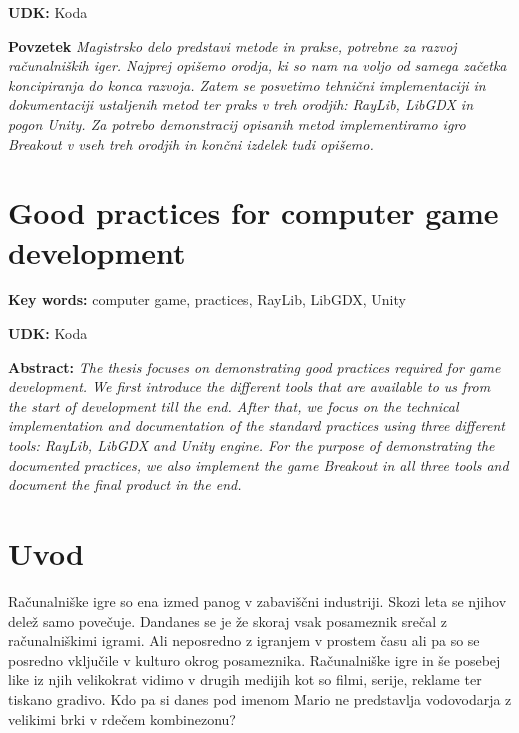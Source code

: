 \documentclass[12pt,a4paper,twoside]{book}
\begin{document}
\textbf{UDK:} Koda

\textbf{Povzetek}\newline
\textit{Magistrsko delo predstavi metode in prakse, potrebne za razvoj računalniških iger. Najprej opišemo orodja, ki so nam na voljo od samega začetka koncipiranja do konca razvoja. Zatem se posvetimo tehnični implementaciji in dokumentaciji ustaljenih metod ter praks v treh orodjih: RayLib, LibGDX in pogon Unity. Za potrebo demonstracij opisanih metod implementiramo igro Breakout v vseh treh orodjih in končni izdelek tudi opišemo.}
\cleardoublepage

\chapter*{Good practices for computer game development}\thispagestyle{fancy}
\textbf{Key words:} computer game, practices, RayLib, LibGDX, Unity

\textbf{UDK:} Koda

\textbf{Abstract:}\newline
\textit{The thesis focuses on demonstrating good practices required for game development. We first introduce the different tools that are available to us from the start of development till the end. After that, we focus on the technical implementation and documentation of the standard practices using three different tools: RayLib, LibGDX and Unity engine. For the purpose of demonstrating the documented practices, we also implement the game Breakout in all three tools and document the final product in the end.}
\cleardoublepage

\tableofcontents

\listoffigures

\lstlistoflistings

\chapter{Uvod}\thispagestyle{fancy}
\setcounter{page}{1}

Računalniške igre so ena izmed panog v zabaviščni industriji. Skozi leta se njihov delež samo povečuje. Dandanes se je že skoraj vsak posameznik srečal z računalniškimi igrami. Ali neposredno z igranjem v prostem času ali pa so se posredno vključile v kulturo okrog posameznika. Računalniške igre in še posebej like iz njih velikokrat vidimo v drugih medijih kot so filmi, serije, reklame ter tiskano gradivo. Kdo pa si danes pod imenom Mario ne predstavlja vodovodarja z velikimi brki v rdečem kombinezonu?
\end{document}

